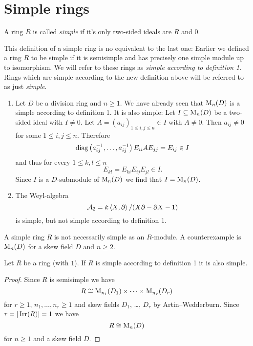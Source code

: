 \section{Simple rings}


\begin{defi}
  A ring $R$ is called \emph{simple} if it’s only two-sided ideals are $R$ and $0$.
\end{defi}


\begin{warn}
  This definition of a simple ring is no equivalent to the last one: Earlier we defined a ring $R$ to be simple if it is semisimple and has precisely one simple module up to isomorphism. We will refer to these rings as \emph{simple according to definition 1}. Rings which are simple according to the new definition above will be referred to as just \emph{simple}.
\end{warn}


\begin{expls}
  \begin{enumerate}[label=\emph{\alph*)},leftmargin=*]
    \item
      Let $D$ be a division ring and $n \geq 1$. We have already seen that $\operatorname{M}_n(D)$ is a simple according to definition 1. It is also simple: Let $I \subseteq \operatorname{M}_n(D)$ be a two-sided ideal with $I \neq 0$. Let $A = (a_{ij})_{1 \leq i,j \leq n} \in I$ with $A \neq 0$. Then $a_{ij} \neq 0$ for some $1 \leq i,j \leq n$. Therefore
      \[
        \operatorname{diag}\left( a_{ij}^{-1}, \dotsc, a_{ij}^{-1} \right) E_{ii} A E_{jj} = E_{ij} \in I
      \]
      and thus for every $1 \leq k,l \leq n$
      \[
        E_{kl} = E_{ki} E_{ij} E_{jl} \in I.
      \]
      Since $I$ is a $D$-submodule of $\operatorname{M}_n(D)$ we find that $I = \operatorname{M}_n(D)$.
    \item
      The Weyl-algebra
      \[
        \mathcal{A}_2 = k \left\langle X,\partial \right\rangle/(X \partial - \partial X - 1)
      \]
      is simple, but not simple according to definition 1.
  \end{enumerate}
\end{expls}


\begin{warn}
  A simple ring $R$ is not necessarily simple as an $R$-module. A counterexample is $\operatorname{M}_n(D)$ for a skew field $D$ and $n \geq 2$.
\end{warn}


\begin{lem}
  Let $R$ be a ring (with $1$). If $R$ is simple according to definition 1 it is also simple.
\end{lem}
\begin{proof}
  Since $R$ is semisimple we have
  \[
    R \cong \operatorname{M}_{n_1}(D_1) \times \dotsb \times \operatorname{M}_{n_r}(D_r)
  \]
  for $r \geq 1$, $n_1, \dotsc, n_r \geq 1$ and skew fields $D_1$, \dots, $D_r$ by Artin--Wedderburn. Since $r = |\operatorname{Irr}(R)| = 1$ we have
  \[
    R \cong \operatorname{M}_n(D)
  \]
  for $n \geq 1$ and a skew field $D$.
\end{proof}


